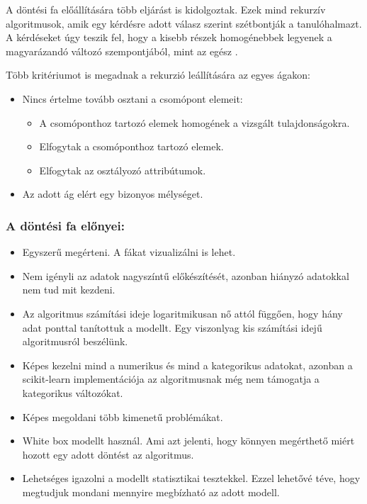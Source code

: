 A döntési fa előállítására több eljárást is kidolgoztak. Ezek mind rekurzív algoritmusok, amik egy kérdésre adott válasz szerint szétbontják a tanulóhalmazt. A kérdéseket úgy teszik fel, hogy a kisebb részek homogénebbek legyenek a magyarázandó változó szempontjából, mint az egész \cite{dontesi_fa_1}.

Több kritériumot is megadnak a rekurzió leállítására az egyes ágakon:
\begin{itemize}
    \item Nincs értelme tovább osztani a csomópont elemeit:
    \begin{itemize}
        \item A csomóponthoz tartozó elemek homogének a vizsgált tulajdonságokra.
        \item Elfogytak a csomóponthoz tartozó elemek.
        \item Elfogytak az osztályozó attribútumok.
    \end{itemize}
    \item Az adott ág elért egy bizonyos mélységet.
\end{itemize}

\subsubsection{A döntési fa előnyei:}
\begin{itemize}
    \item Egyszerű megérteni. A fákat vizualizálni is lehet.
    \item Nem igényli az adatok nagyszíntű előkészítését, azonban hiányzó adatokkal nem tud mit kezdeni.
    \item Az algoritmus számítási ideje logaritmikusan nő attól függően, hogy hány adat ponttal tanítottuk a modellt. Egy viszonlyag kis számítási idejű algoritmusról beszélünk.
    \item Képes kezelni mind a numerikus és mind a kategorikus adatokat, azonban a scikit-learn implementációja az algoritmusnak még nem támogatja a kategorikus változókat.
    \item Képes megoldani több kimenetű problémákat.
    \item White box modellt használ. Ami azt jelenti, hogy könnyen megérthető miért hozott egy adott döntést az algoritmus.
    \item Lehetséges igazolni a modellt statisztikai tesztekkel. Ezzel lehetővé téve, hogy megtudjuk mondani mennyire megbízható az adott modell.
\end{itemize}
